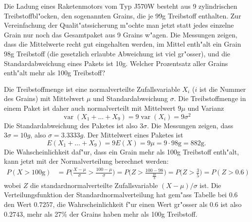Die Ladung eines Raketenmotors vom Typ J570W besteht aus 9 zylindrischen
Treibstoffbl"ocken, den sogenannten Grains,
die je 99g Treibstoff enthalten. Zur Vereinfachung der Qualit"atssicherung
m"ochte man jetzt statt jedes einzelne Grain nur noch das Gesamtpaket
aus 9 Grains
w"agen. Die Messungen zeigen, dass die Mittelwerte recht gut eingehalten
werden, im Mittel enth"alt ein Grain 98g Treibstoff (die gesetzlich erlaubte
Abweichung ist viel gr"osser), und die Standardabweichung eines Pakets
ist 10g. Welcher Prozentsatz aller Grains enth"alt mehr als 100g Treibstoff?

\begin{loesung}
Die Treibstoffmenge ist eine normalverteilte Zufallsvariable $X_i$
($i$ ist die Nummer des Grains)
mit Mittelwert $\mu$ und
Standardabweichung $\sigma$. Die Treibstoffmenge in einem
Paket ist daher auch normalverteilt mit Mittelwert $9\mu$ und
Varianz
\[
\operatorname{var}(X_1+\dots+X_9)=9\operatorname{var}(X_i)=9\sigma^2
\]
Die Standardabweichung des Paketes ist also $3\sigma$. Die Messungen
zeigen, dass $3\sigma=10g$, also $\sigma=3.3333g$. Der Mittelwert
eines Paketes ist
\[
E(X_1+\dots+X_9)=9E(X)=9\mu=9\cdot 98\text{g} = 882\text{g}.
\]
Die Wahscheinlichkeit daf"ur, dass ein Grain mehr als 100g Treibstoff
enth"alt, kann jetzt mit der Normalverteilung berechnet werden:
\begin{align*}
P(X>100\text{g})
&=
P\biggl(\frac{X-\mu}{\sigma}>\frac{100-\mu}{\sigma}\biggr)
=
P\biggl(Z>\frac{100-98}{\frac{10}{3}}\biggr)
=
P\biggl(Z>\frac{3}{5}\biggr)
=
P(Z > 0.6)
\end{align*}
wobei $Z$ die standardnormalverteilte Zufallsvariable $(X-\mu)/\sigma$ ist.
Die
Verteilungsfunktion der Standardnormalverteilung hat gem"ass
Tabelle bei $0.6$
den Wert $0.7257$, die Wahrscheinlichkeit f"ur einen Wert gr"osser
als $0.6$ ist also $0.2743$, mehr als 27\% der Grains haben mehr
als 100g Treibstoff.
\end{loesung}

